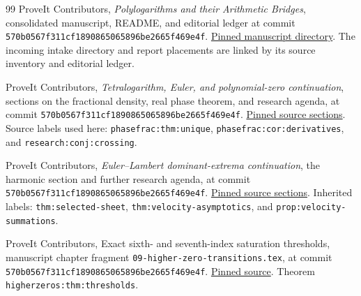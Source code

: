 \documentclass[11pt,a4paper]{article}
\numberwithin{equation}{section}
\theoremstyle{definition}
\theoremstyle{remark}
\newcommand{\baselinecommit}{570b0567f311cf1890865065896be2665f469e4f}
\begin{document}
\begin{thebibliography}{99}
ProveIt Contributors, \emph{Polylogarithms and their Arithmetic Bridges},
consolidated manuscript, README, and editorial ledger at commit
\texttt{\baselinecommit}.
\href{https://github.com/VladimirReshetnikov/ProveIt/tree/570b0567f311cf1890865065896be2665f469e4f/Analysis/Polylogarithms/docs/manuscript}{Pinned manuscript directory}.
The incoming intake directory and report placements are linked by its
source inventory and editorial ledger.

ProveIt Contributors, \emph{Tetralogarithm, Euler, and polynomial-zero
continuation}, sections on the fractional density, real phase theorem,
and research agenda, at commit \texttt{\baselinecommit}.
\href{https://github.com/VladimirReshetnikov/ProveIt/tree/570b0567f311cf1890865065896be2665f469e4f/Analysis/Polylogarithms/docs/reports/uniform-transition-continuation/continuations/tetralogarithm-euler-polynomial-zeros/sections}{Pinned source sections}.
Source labels used here: \texttt{phasefrac:thm:unique},
\texttt{phasefrac:cor:derivatives}, and
\texttt{research:conj:crossing}.

ProveIt Contributors, \emph{Euler--Lambert dominant-extrema continuation},
the harmonic section and further research agenda, at commit
\texttt{\baselinecommit}.
\href{https://github.com/VladimirReshetnikov/ProveIt/tree/570b0567f311cf1890865065896be2665f469e4f/Analysis/Polylogarithms/docs/reports/lerch-global-phase/continuations/euler-lambert-dominant-extrema/sections}{Pinned source sections}.
Inherited labels: \texttt{thm:selected-sheet},
\texttt{thm:velocity-asymptotics}, and
\texttt{prop:velocity-summations}.

ProveIt Contributors, Exact sixth- and seventh-index saturation
thresholds, manuscript chapter fragment
\texttt{09-higher-zero-transitions.tex}, at commit
\texttt{\baselinecommit}.
\href{https://github.com/VladimirReshetnikov/ProveIt/blob/570b0567f311cf1890865065896be2665f469e4f/Analysis/Polylogarithms/docs/manuscript/chapters/09-higher-zero-transitions.tex}{Pinned source}.
Theorem \texttt{higherzeros:thm:thresholds}.



\end{thebibliography}
\end{document}

